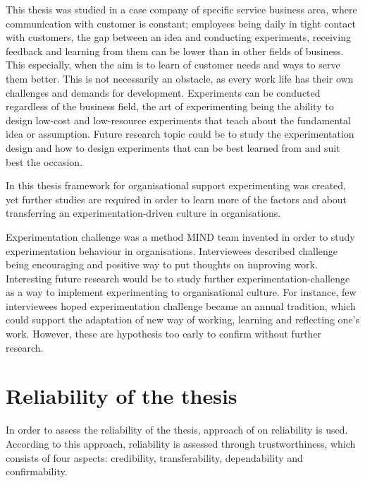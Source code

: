 This thesis was studied in a case company of specific service business area, where communication with customer is constant; employees being daily in tight contact with customers, the gap between an idea and conducting experiments, receiving feedback and learning from them can be lower than in other fields of business. This especially, when the aim is to learn of customer needs and ways to serve them better. This is not necessarily an obstacle, as every work life has their own challenges and demands for development. Experiments can be conducted regardless of the business field, the art of experimenting being the ability to design low-cost and low-resource experiments that teach about the fundamental idea or assumption. Future research topic could be to study the experimentation design and how to design experiments that can be best learned from and suit best the occasion. 

In this thesis framework for organisational support experimenting was created, yet further studies are required in order to learn more of the factors and about transferring an experimentation-driven culture in organisations. 

Experimentation challenge was a method MIND team invented in order to study experimentation behaviour in organisations. Interviewees described challenge being encouraging and positive way to put thoughts on improving work. Interesting future research would be to study further experimentation-challenge as a way to implement experimenting to organisational culture. For instance, few interviewees hoped experimentation challenge became an annual tradition, which could support the adaptation of new way of working, learning and reflecting one's work. However, these are hypothesis too early to confirm without further research. 

\section{Reliability of the thesis}
In order to assess the reliability of the thesis, approach of \citet{lincoln1985naturalistic} on reliability is used. According to this approach, reliability is assessed through trustworthiness, which consists of four aspects: credibility, transferability, dependability and confirmability. 

